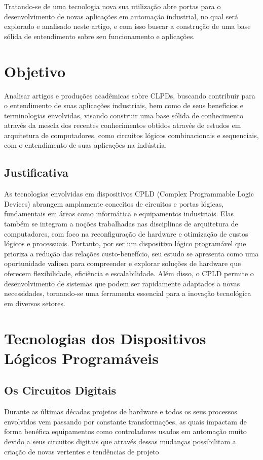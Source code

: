 Tratando-se de uma tecnologia nova sua utilização abre portas para o desenvolvimento de novas aplicações em automação industrial, no qual será explorado e analisado neste artigo, e com isso buscar a construção de uma base sólida de entendimento sobre seu funcionamento e aplicações.

\section{\esp Objetivo}

Analisar artigos e produções acadêmicas sobre CLPDs, buscando contribuir para o entendimento de suas aplicações industriais, bem como de seus benefícios e terminologias envolvidas, visando construir uma base sólida de conhecimento através da mescla dos recentes conhecimentos obtidos através de estudos em arquitetura de computadores, como circuitos lógicos combinacionais e sequenciais, com o entendimento de suas aplicações na indústria.

\subsection{\esp Justificativa} 
\label{subsec:1}
As tecnologias envolvidas em dispositivos CPLD (Complex Programmable Logic Devices) abrangem amplamente conceitos de circuitos e portas lógicas, fundamentais em áreas como informática e equipamentos industriais. Elas também se integram a noções trabalhadas nas disciplinas de arquitetura de computadores, com foco na reconfiguração de hardware e otimização de custos lógicos e processuais. Portanto, por ser um dispositivo lógico programável que prioriza a redução das relações custo-benefício, seu estudo se apresenta como uma oportunidade valiosa para compreender e explorar soluções de hardware que oferecem flexibilidade, eficiência e escalabilidade. Além disso, o CPLD permite o desenvolvimento de sistemas que podem ser rapidamente adaptados a novas necessidades, tornando-se uma ferramenta essencial para a inovação tecnológica em diversos setores.

\section{\esp Tecnologias dos Dispositivos Lógicos Programáveis}

\subsection{\esp Os Circuitos Digitais  }
Durante as últimas décadas projetos de hardware e todos os seus processos envolvidos vem passando por constante transformações, as quais impactam de forma benéfica equipamentos como controladores usados em automação muito devido a seus circuitos digitais que através dessas mudanças possibilitam a criação de novas vertentes e tendências de projeto
\cite{Freitas2015}

